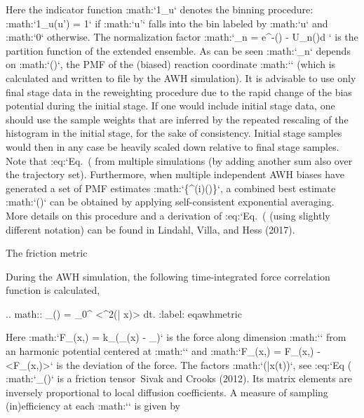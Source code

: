 Here the indicator function :math:`1_u` denotes the binning procedure:
:math:`1_u(u') = 1` if :math:`u'` falls into the bin labeled by
:math:`u` and :math:`0` otherwise. The normalization factor
:math:`_n = \int e^{-\Phi(\xi) - U_{n}(\xi)}d \xi` is the
partition function of the extended ensemble. As can be seen
:math:`_n` depends on :math:`\Phi(\xi)`, the PMF of the
(biased) reaction coordinate :math:`\xi` (which is calculated and
written to file by the AWH simulation). It is advisable to use only
final stage data in the reweighting procedure due to the rapid change of
the bias potential during the initial stage. If one would include
initial stage data, one should use the sample weights that are inferred
by the repeated rescaling of the histogram in the initial stage, for the
sake of consistency. Initial stage samples would then in any case be
heavily scaled down relative to final stage samples. Note that
:eq:`Eq. (%
from multiple simulations (by adding another sum also over the
trajectory set). Furthermore, when multiple independent AWH biases have
generated a set of PMF estimates :math:`\{\hat{\Phi}^{(i)}(\xi)\}`, a
combined best estimate :math:`\hat{\Phi}(\xi)` can be obtained by
applying self-consistent exponential averaging. More details on this
procedure and a derivation of :eq:`Eq. (%
(using slightly different notation) can be found in Lindahl, Villa, and
Hess (2017).

The friction metric
~~~~~~~~~~~~~~~~~~~

During the AWH simulation, the following time-integrated force
correlation function is calculated,

.. math:: \eta_{\mu\nu}(\lambda) =
          \beta
          \int_0^\infty
          {\left<{\omega^2(\lambda | x)}\right>}
          dt.
          :label: eqawhmetric

Here
:math:`\mathcal F_\mu(x,\lambda) = k_\mu (\xi_\mu(x) - \lambda_\mu)` is
the force along dimension :math:`\mu` from an harmonic potential
centered at :math:`\lambda` and
:math:`\delta \mathcal F_\mu(x,\lambda) = \mathcal F_\mu(x,\lambda) - {\left<{\mathcal F_\mu(x,\lambda)}\right>}`
is the deviation of the force. The factors :math:`\omega(\lambda|x(t))`,
see :eq:`Eq (%
:math:`\eta_{\mu\nu}(\lambda)` is a friction tensor Sivak and Crooks
(2012). Its matrix elements are inversely proportional to local
diffusion coefficients. A measure of sampling (in)efficiency at each
:math:`\lambda` is given by

